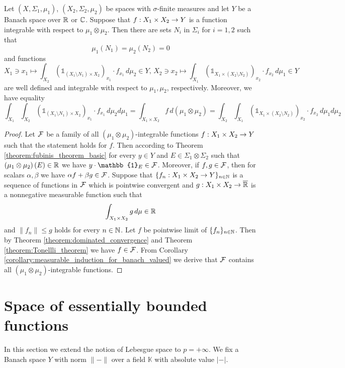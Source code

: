 \begin{theorem}[Fubini]\label{theorem:fubini}
    Let $(X,\Sigma_1,\mu_1)$, $(X_2,\Sigma_2,\mu_2)$ be spaces with $\sigma$-finite measures and let $Y$ be a Banach space over ${\mathbb R}$ or ${\mathbb C}$. Suppose that $f:X_1\times X_2\rightarrow Y$ is a function integrable with respect to $\mu_1\otimes \mu_2$. Then there are sets $N_i$ in $\Sigma_i$ for $i=1,2$ such that
    $$\mu_1(N_1) = \mu_2(N_2) = 0$$
    and functions
    $$X_1 \ni x_1\mapsto \int_{X_2}\left(\mathbb{1}_{\left(X_1\setminus N_1\right)\times X_2}\right)_{x_1}\cdot f_{x_1}\,d\mu_2\in Y,\,X_2 \ni x_2\mapsto \int_{X_1}\left(\mathbb{1}_{X_1\times \left(X_2\setminus N_2\right)}\right)_{x_2}\cdot f_{x_2}\,d\mu_1\in Y$$
    are well defined and integrable with respect to $\mu_1, \mu_2$, respectively. Moreover, we have equality
    $$\int_{X_1}\int_{X_2} \left(\mathbb{1}_{\left(X_1\setminus N_1\right)\times X_2}\right)_{x_1}\cdot f_{x_1}\,d\mu_2d\mu_1 = \int_{X_1\times X_2}f\,d(\mu_1\otimes \mu_2) = \int_{X_2}\int_{X_1} \left(\mathbb{1}_{X_1\times \left(X_2\setminus N_2\right)}\right)_{x_2}\cdot f_{x_2}\,d\mu_1d\mu_2$$
\end{theorem}
\begin{proof}
    Let ${\mathcal F}$ be a family of all $\left(\mu_1\otimes \mu_2\right)$-integrable functions $f:X_1\times X_2\rightarrow Y$ such that the statement holds for $f$. Then according to Theorem \ref{theorem:fubinis_theorem_basic} for every $y\in Y$ and $E\in \Sigma_1\otimes \Sigma_2$ such that $\left(\mu_1\otimes \mu_2\right)(E) \in {\mathbb R}$ we have $y\cdot \mathbb{1}_E \in \cF$. Moreover, if $f, g\in {\mathcal F}$, then for scalars $\alpha,\beta$ we have $\alpha f + \beta g\in {\mathcal F}$. Suppose that $\{f_n:X_1\times X_2\rightarrow Y\}_{n\in {\mathbb N}}$ is a sequence of functions in ${\mathcal F}$ which is pointwise convergent and $g:X_1\times X_2\rightarrow \overline{{\mathbb R}}$ is a nonnegative measurable function such that
    $$\int_{X_1\times X_2}g\,d\mu \in {\mathbb R}$$
    and $\lVert f_n\rVert \leq g$ holds for every $n\in {\mathbb N}$. Let $f$ be pointwise limit of $\{f_n\}_{n\in {\mathbb N}}$. Then by Theorem \ref{theorem:dominated_convergence} and Theorem \ref{theorem:Tonellli_theorem} we have $f\in {\mathcal F}$. From Corollary \ref{corollary:measurable_induction_for_banach_valued} we derive that ${\mathcal F}$ contains all $\left(\mu_1\otimes \mu_2\right)$-integrable functions.
\end{proof}

\section{Space of essentially bounded functions}
\noindent
In this section we extend the notion of Lebesgue space to $p = +\infty$. We fix a Banach space $Y$ with norm $\lVert-\rVert$ over a field $\mathbb{K}$ with absolute value $|-|$.

